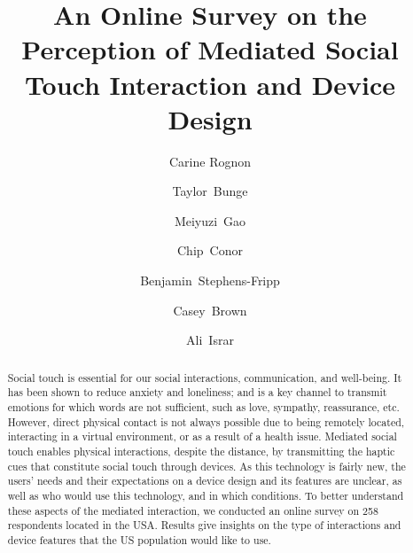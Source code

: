 \documentclass[acmsmall]{acmart}
\begin{document}
\title{An Online Survey on the Perception of Mediated Social Touch Interaction and Device Design}

\author{Carine Rognon}


\author{Taylor~Bunge}

\author{Meiyuzi~Gao}

\author{Chip~Conor}

\author{Benjamin~Stephens-Fripp}

\author{Casey~Brown}

\author{Ali~Israr}

\renewcommand{\shortauthors}{Rognon, et al.}

\begin{abstract}
Social touch is essential for our social interactions, communication, and well-being. It has been shown to reduce anxiety and loneliness; and is a key channel to transmit emotions for which words are not sufficient, such as love, sympathy, reassurance, etc. However, direct physical contact is not always possible due to being remotely located, interacting in a virtual environment, or as a result of a health issue. Mediated social touch enables physical interactions, despite the distance, by transmitting the haptic cues that constitute social touch through devices. As this technology is fairly new, the users’ needs and their expectations on a device design and its features are unclear, as well as who would use this technology, and in which conditions. To better understand these aspects of the mediated interaction, we conducted an online survey on 258 respondents located in the USA. Results give insights on the type of interactions and device features that the US population would like to use. 
\end{abstract}
\end{document}
